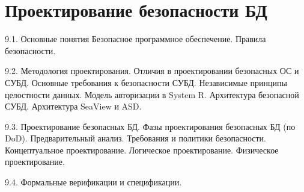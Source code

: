 \section{Проектирование безопасности БД}

9.1. Основные понятия 
Безопасное программное обеспечение. Правила безопасности.

9.2. Методология проектирования. 
Отличия в проектировании безопасных ОС и СУБД. Основные требования к безопасности СУБД. Независимые принципы целостности данных. Модель авторизации в System R. Архитектура безопасной СУБД. Архитектура SeaView и ASD.

9.3. Проектирование безопасных БД.
Фазы проектирования безопасных БД (по DoD). Предварительный анализ. Требования и политики  безопасности. Концептуальное проектирование. Логическое  проектирование. Физическое проектирование. 

9.4. Формальные верификации и спецификации.